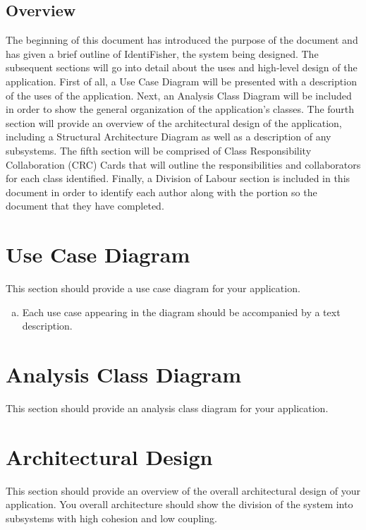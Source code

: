 \documentclass[]{article}
\begin{document}
\subsection{Overview}
\label{sub:overview}
	The beginning of this document has introduced the purpose of the document and has given a brief outline of IdentiFisher, the system being designed. The subsequent sections will go into detail about the uses and high-level design of the application. First of all, a Use Case Diagram will be presented with a description of the uses of the application. Next, an Analysis Class Diagram will be included in order to show the general organization of the application's classes. The fourth section will provide an overview of the architectural design of the application, including a Structural Architecture Diagram as well as a description of any subsystems. The fifth section will be comprised of Class Responsibility Collaboration (CRC) Cards that will outline the responsibilities and collaborators for each class identified. Finally, a Division of Labour section is included in this document in order to identify each author along with the portion so the document that they have completed. 


\section{Use Case Diagram}
\label{sec:use_case_diagram}
This section should provide a use case diagram for your application. 
\begin{enumerate}[a)]
	\item Each use case appearing in the diagram should be accompanied by a text description. 
\end{enumerate}

\section{Analysis Class Diagram}
\label{sec:analysis_class_diagram}
This section should provide an analysis class diagram for your application.


\section{Architectural Design}
\label{sec:architectural_design}
This section should provide an overview of the overall architectural design of your application. You overall architecture should show the division of the system into subsystems with high cohesion and low coupling.
\end{document}

